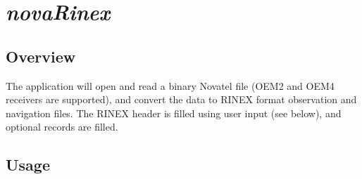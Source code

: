%
%

\section{\emph{novaRinex}}
\subsection{Overview}
The application will open and read a binary Novatel file
  (OEM2 and OEM4 receivers are supported), and convert the data to RINEX format
  observation and navigation files. The RINEX header is filled using user input
  (see below), and optional records are filled.

\subsection{Usage}
